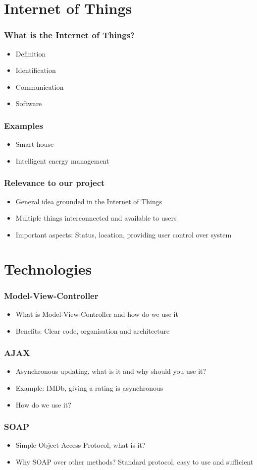 \section{Internet of Things}

\begin{frame}
\frametitle{What is the Internet of Things?}
\begin{itemize}
\item Definition
\item Identification
\item Communication
\item Software
\end{itemize}
\end{frame}

\begin{frame}
\frametitle{Examples}
\begin{itemize}
\item Smart house
\item Intelligent energy management
\end{itemize}
\end{frame}

\begin{frame}
\frametitle{Relevance to our project}
\begin{itemize}
\item General idea grounded in the Internet of Things
\item Multiple things interconnected and available to users
\item Important aspects: Status, location, providing user control over system
\end{itemize}
\end{frame}

\section{Technologies}
\begin{frame}
\frametitle{Model-View-Controller}
\begin{itemize}
\item What is Model-View-Controller and how do we use it
\item Benefits: Clear code, organisation and architecture
\end{itemize}
\end{frame}

\begin{frame}
\frametitle{AJAX}
\begin{itemize}
\item Asynchronous updating, what is it and why should you use it?
\item Example: IMDb, giving a rating is asynchronous
\item How do we use it?
\end{itemize}
\end{frame}

\begin{frame}
\frametitle{SOAP}
\begin{itemize}
\item Simple Object Access Protocol, what is it?
\item Why SOAP over other methods? Standard protocol, easy to use and sufficient
\end{itemize}
\end{frame}